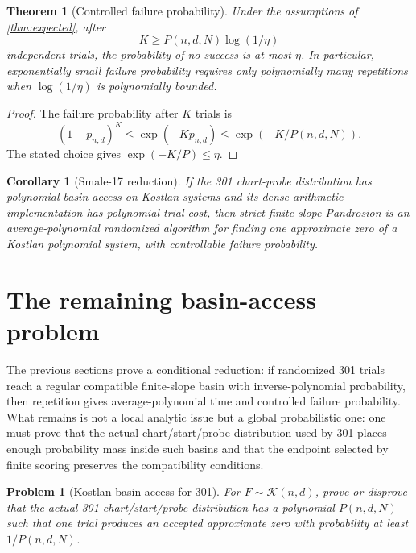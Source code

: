 \documentclass[11pt]{article}
\newtheorem{theorem}[definition]{Theorem}
\newtheorem{corollary}[definition]{Corollary}
\newtheorem{problem}[definition]{Problem}
\newcommand{\K}{\mathcal K}
\begin{document}
\begin{theorem}[Controlled failure probability]\label{thm:failure}
Under the assumptions of \cref{thm:expected}, after
\[
        K\ge P(n,d,N)\log(1/\eta)
\]
independent trials, the probability of no success is at most $\eta$.  In particular, exponentially small failure probability requires only polynomially many repetitions when $\log(1/\eta)$ is polynomially bounded.
\end{theorem}

\begin{proof}
The failure probability after $K$ trials is
\[
        (1-p_{n,d})^K\le \exp(-Kp_{n,d})\le \exp\left(-K/P(n,d,N)\right).
\]
The stated choice gives $\exp(-K/P)\le\eta$.
\end{proof}

\begin{corollary}[Smale-17 reduction]\label{cor:reduction}
If the 301 chart-probe distribution has polynomial basin access on Kostlan systems and its dense arithmetic implementation has polynomial trial cost, then strict finite-slope Pandrosion is an average-polynomial randomized algorithm for finding one approximate zero of a Kostlan polynomial system, with controllable failure probability.
\end{corollary}

\section{The remaining basin-access problem}

The previous sections prove a conditional reduction: if randomized 301 trials reach a regular compatible finite-slope basin with inverse-polynomial probability, then repetition gives average-polynomial time and controlled failure probability.  What remains is not a local analytic issue but a global probabilistic one: one must prove that the actual chart/start/probe distribution used by 301 places enough probability mass inside such basins and that the endpoint selected by finite scoring preserves the compatibility conditions.

\begin{problem}[Kostlan basin access for 301]\label{prob:basin-access}
For $F\sim\K(n,d)$, prove or disprove that the actual 301 chart/start/probe distribution has a polynomial $P(n,d,N)$ such that one trial produces an accepted approximate zero with probability at least $1/P(n,d,N)$.
\end{problem}
\end{document}
